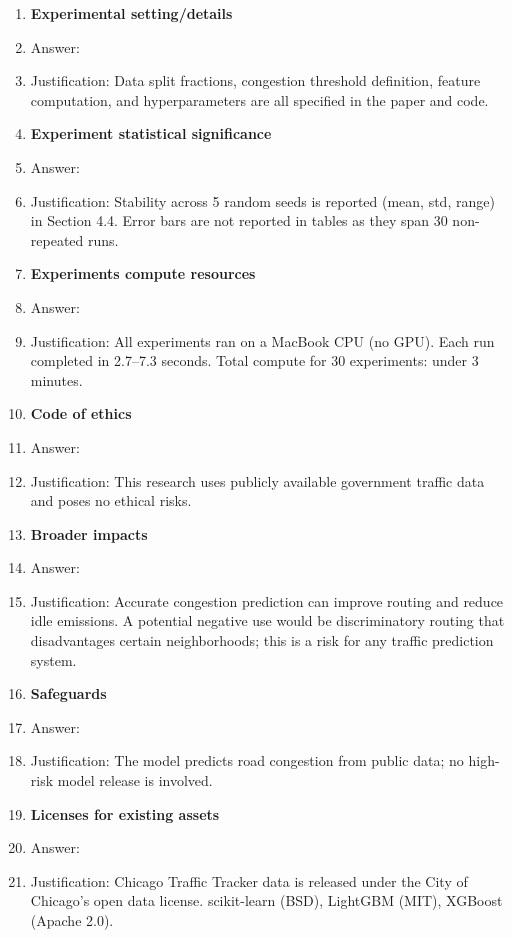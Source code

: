 \documentclass{article}
\begin{document}
\begin{enumerate}
\item {\bf Experimental setting/details}
    \item[] Answer: \answerYes{}
    \item[] Justification: Data split fractions, congestion threshold definition,
    feature computation, and hyperparameters are all specified in the paper and code.

\item {\bf Experiment statistical significance}
    \item[] Answer: \answerYes{}
    \item[] Justification: Stability across 5 random seeds is reported (mean, std, range)
    in Section 4.4. Error bars are not reported in tables as they span 30 non-repeated runs.

\item {\bf Experiments compute resources}
    \item[] Answer: \answerYes{}
    \item[] Justification: All experiments ran on a MacBook CPU (no GPU). Each run
    completed in 2.7--7.3 seconds. Total compute for 30 experiments: under 3 minutes.

\item {\bf Code of ethics}
    \item[] Answer: \answerYes{}
    \item[] Justification: This research uses publicly available government traffic data
    and poses no ethical risks.

\item {\bf Broader impacts}
    \item[] Answer: \answerYes{}
    \item[] Justification: Accurate congestion prediction can improve routing and reduce
    idle emissions. A potential negative use would be discriminatory routing that
    disadvantages certain neighborhoods; this is a risk for any traffic prediction system.

\item {\bf Safeguards}
    \item[] Answer: \answerNA{}
    \item[] Justification: The model predicts road congestion from public data;
    no high-risk model release is involved.

\item {\bf Licenses for existing assets}
    \item[] Answer: \answerYes{}
    \item[] Justification: Chicago Traffic Tracker data is released under the City of
    Chicago's open data license. scikit-learn (BSD), LightGBM (MIT), XGBoost (Apache 2.0).


\end{enumerate}
\end{document}

